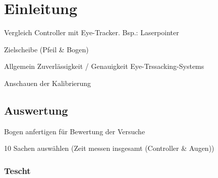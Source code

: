 
\chapter{Einleitung}
Vergleich Controller mit Eye-Tracker. Bsp.: Laserpointer 

Zielscheibe (Pfeil \& Bogen)

Allgemein Zuverlässigkeit / Genauigkeit Eye-Trssacking-Systems

Anschauen der Kalibrierung  

\section{Auswertung}
Bogen anfertigen für Bewertung der Versuche

10 Sachen auswählen (Zeit messen insgesamt (Controller \& Augen))

\subsection{Tescht}